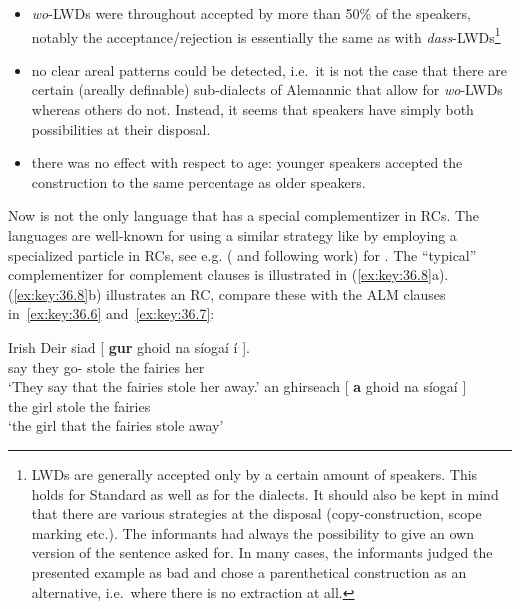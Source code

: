 \documentclass[output=paper]{langsci/langscibook}
\begin{document}
\begin{itemize}

    \item \emph{wo}-\glspl{LWD} were throughout accepted by more than 50\% of the
        speakers, notably the acceptance/rejection is essentially the same as
        with \emph{dass}-\glspl{LWD}\footnote{\glspl{LWD} are generally accepted only by a
        certain amount of speakers. This holds for Standard  as well as
    for the dialects. It should also be kept in mind that there are various
strategies at the disposal (copy-construction, scope marking etc.). The
informants had always the possibility to give an own version of the sentence
asked for. In many cases, the informants judged the presented example as bad
and chose a parenthetical construction as an alternative, i.e.\ where there is
no extraction at all.}

    \item no clear areal patterns could be detected, i.e.\ it is not the case
        that there are certain (areally definable) sub-dialects of Alemannic
        that allow for \emph{wo}-\glspl{LWD} whereas others do not. Instead, it seems
        that  speakers have simply both possibilities at their
        disposal.

    \item there was no effect with respect to age: younger speakers accepted
        the construction to the same percentage as older speakers.

\end{itemize}

Now  is not the only language that has a special complementizer in
\glspl{RC}. The  languages are well-known for using a similar strategy
like  by employing a specialized particle in \glspl{RC}, see e.g.
(\citealt{McCloskey2001,McCloskey:2002a} and following work) for . The
\enquote{typical} complementizer for complement clauses is illustrated in
(\ref{ex:key:36.8}a).  (\ref{ex:key:36.8}b) illustrates an \gls{RC}, compare
these with the ALM clauses in~\eqref{ex:key:36.6} and~\eqref{ex:key:36.7}:

\ea\label{ex:key:36.8}Irish
    \ea
        \gll Deir siad [ \textbf{gur} ghoid na síogaí í ].\\
            say they {} go-\Pst{} stole the fairies her\\
        \glt ‘They say that the fairies stole her away.’
    \ex
        \gll an ghirseach [ \textbf{a} ghoid na síogaí \underline{\hphantom{2em}} ]\\
        the girl {} \Rci{} stole the fairies\\
        \glt ‘the girl that the fairies stole away’
    \z
\z
\end{document}

